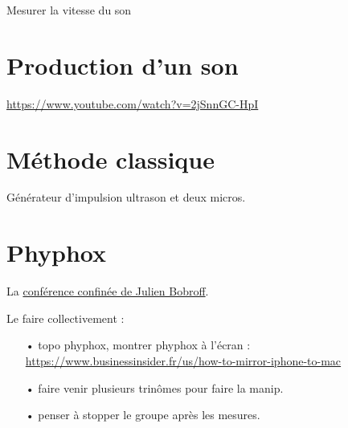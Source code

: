 \documentclass[12pt,a4paper]{article}
\begin{document}
\begin{header}
Mesurer la vitesse du son
\end{header}

\section*{Production d'un son}

\href{https://www.youtube.com/watch?v=2jSnnGC-HpI}{https://www.youtube.com/watch?v=2jSnnGC-HpI}

\section*{Méthode classique}

Générateur d'impulsion ultrason et deux micros.

\section*{Phyphox}

La \href{https://youtu.be/RhWikn-uRjk?t=1431}{conférence confinée de Julien Bobroff}.

Le faire collectivement :
\begin{itemize}
\item[•] topo phyphox, montrer phyphox à l'écran : \href{https://www.businessinsider.fr/us/how-to-mirror-iphone-to-mac}{https://www.businessinsider.fr/us/how-to-mirror-iphone-to-mac}
\item[•] faire venir plusieurs trinômes pour faire la manip.
\item[•] penser à stopper le groupe après les mesures.
\end{itemize}
\end{document}

